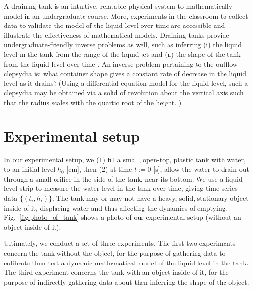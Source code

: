 \documentclass[openacc]{rsproca_new}%
\begin{document}

A draining tank is an intuitive, relatable physical system to mathematically model in an undergraduate course. 
More, experiments in the classroom to collect data to validate the model of the liquid level over time are accessible and illustrate the effectiveness of mathematical models.
\cite{farmer1992physical,driver1998torricelli,brady2009siphons,rother2024modelling,paldy1963apparatus,ivanov2014testing,williams2021vessel,pavesi2019investigating,planinvsivc2011holes,saleta2005experimental,lopac2015water}
Draining tanks provide undergraduate-friendly inverse problems \cite{groetsch1993inverse,neto2012introduction,tarantola2005inverse} as well, such as inferring (i) the liquid level in the tank from the range of the liquid jet and (ii) the shape of the tank from the liquid level over time \cite{groetsch1993inverse,groetsch1999inverse}. 
An inverse problem pertaining to the outflow clepsydra is: what container shape gives a constant rate of decrease in the liquid level as it drains?
(Using a differential equation model for the liquid level, such a clepsydra may be obtained via a solid of revolution about the vertical axis such that the radius scales with the quartic root of the height. \cite{mills1982newton,d2021torricelli})


\section{Experimental setup}
In our experimental setup, we (1) fill a small, open-top, plastic tank with water, to an initial level $h_0$ [cm], then (2) at time $t:=0$ [s], allow the water to drain out through a small orifice in the side of the tank, near its bottom. We use a liquid level strip to measure the water level in the tank over time, giving time series data $\{(t_i, h_i)\}$. The tank may or may not have a heavy, solid, stationary object inside of it, displacing water and thus affecting the dynamics of emptying. Fig.~\ref{fig:photo_of_tank} shows a photo of our experimental setup (without an object inside of it).

Ultimately, we conduct a set of three experiments. The first two experiments concern the tank without the object, for the purpose of gathering data to calibrate then test a dynamic mathematical model of the liquid level in the tank. The third experiment concerns the tank with an object inside of it, for the purpose of indirectly gathering data about then inferring the shape of the object.
\end{document}

